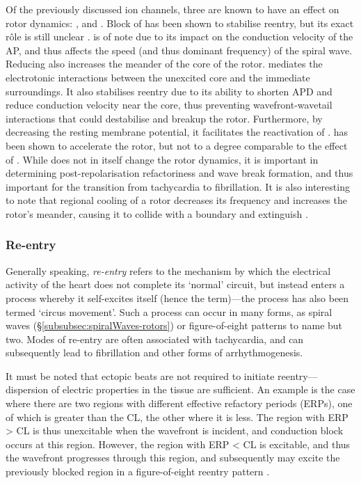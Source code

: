\documentclass[../thesis-main.tex]{subfiles}
\begin{document}
 Of the previously discussed ion channels, three are known to have an effect on rotor dynamics: \ina{}, \ikix{} and \iks{}. Block of \ica{} has been shown to stabilise reentry, but its exact r\^ole is still unclear \citep{Jalife2003, Jalife2009}. \ina{} is of note due to its impact on the conduction velocity of the AP, and thus affects the speed (and thus dominant frequency) of the spiral wave. Reducing \ina{} also increases the meander of the core of the rotor. \ikix{} mediates the electrotonic interactions between the unexcited core and the immediate surroundings. It also stabilises reentry due to its ability to shorten APD and reduce conduction velocity near the core, thus preventing wavefront-wavetail interactions that could destabilise and breakup the rotor. Furthermore, by decreasing the resting membrane potential, it facilitates the reactivation of \ina{} \citep{Pandit2013}. \ikr{} has been shown to accelerate the rotor, but not to a degree comparable to the effect of \ikix{}. While \iks{} does not in itself change the rotor dynamics, it is important in determining post-repolarisation refactoriness and wave break formation, and thus important for the transition from tachycardia to fibrillation. It is also interesting to note that regional cooling of a rotor decreases its frequency and increases the rotor's meander, causing it to collide with a boundary and extinguish \citep{Yamazaki2012}.
 
 \subsubsection{Re-entry}
 \label{subsubsec:reentry}
 Generally speaking, \emph{re-entry} refers to the mechanism by which the electrical activity of the heart does not complete its `normal' circuit, but instead enters a process whereby it self-excites itself (hence the term)---the process has also been termed `circus movement'. Such a process can occur in many forms, as spiral waves (\S\ref{subsubsec:spiralWaves-rotors}) or figure-of-eight patterns \citep{Ferrero2003} to name but two. Modes of re-entry are often associated with tachycardia, and can subsequently lead to fibrillation and other forms of arrhythmogenesis.
 
 It must be noted that ectopic beats are not required to initiate reentry---dispersion of electric properties in the tissue are sufficient. An example is the case where there are two regions with different effective refactory periods (ERPs), one of which is greater than the CL, the other where it is less. The region with ERP > CL is thus unexcitable when the wavefront is incident, and conduction block occurs at this region. However, the region with ERP < CL is excitable, and thus the wavefront progresses through this region, and subsequently may excite the previously blocked region in a figure-of-eight reentry pattern \citep{Weiss2006}.

 \biblio
\end{document}
